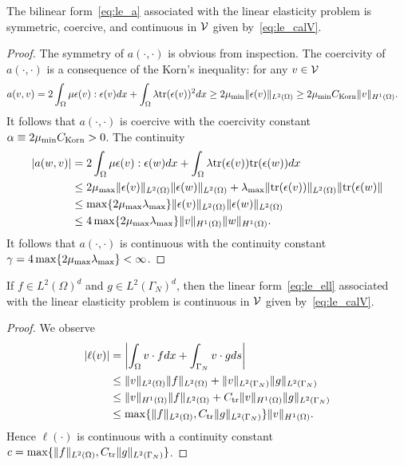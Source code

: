 \begin{proposition}
  The bilinear form~\eqref{eq:le_a} associated with the linear elasticity problem is symmetric, coercive, and continuous in $\mathcal{V}$ given by~\eqref{eq:le_calV}.
  \begin{proof}
    The symmetry of $a(\cdot,\cdot)$ is obvious from inspection. The coercivity of $a(\cdot,\cdot)$ is a consequence of the Korn's inequality: for any $v \in \mathcal{V}$
    \begin{align*}
      a(v,v)
      &= 2 \int_{\Omega} \mu \epsilon(v) : \epsilon(v) dx
      + \int_\Omega  \lambda \text{tr}(\epsilon(v))^2 dx
      \geq 2 \mu_{\rm min} \| \epsilon(v) \|_{L^2(\Omega)}
      \geq 2 \mu_{\rm min} C_{\rm Korn} \| v \|_{H^1(\Omega)}.
    \end{align*}
    It follows that $a(\cdot,\cdot)$ is coercive with the coercivity constant $\alpha \equiv 2 \mu_{\rm min} C_{\rm Korn} > 0$. The continuity
    \begin{align*}
      |a(w,v)|
      &= 2 \int_{\Omega} \mu \epsilon(v) : \epsilon(w) dx
      + \int_\Omega  \lambda \text{tr}(\epsilon(v))\text{tr}(\epsilon(w)) dx
      \\
      &\leq 2 \mu_{\rm max} \| \epsilon(v) \|_{L^2(\Omega)} \| \epsilon(w) \|_{L^2(\Omega)}
      + \lambda_{\rm max} \| \text{tr}(\epsilon(v)) \|_{L^2(\Omega)} \| \text{tr}(\epsilon(w) \|
      \\
      &\leq \max \{ 2\mu_{\rm max} \lambda_{\rm max} \} \| \epsilon(v) \|_{L^2(\Omega)} \| \epsilon(w) \|_{L^2(\Omega)}
      \\
      &\leq 4 \max \{ 2\mu_{\rm max} \lambda_{\rm max} \} \| v \|_{H^1(\Omega)} \| w \|_{H^1(\Omega)}.
    \end{align*}
    It follows that $a(\cdot,\cdot)$ is continuous with the continuity constant $\gamma = 4 \max \{ 2\mu_{\rm max} \lambda_{\rm max} \} < \infty$.
  \end{proof}
\end{proposition}
\begin{proposition}
  If $f \in L^2(\Omega)^d$ and $g \in L^2(\Gamma_N)^d$, then the linear form~\eqref{eq:le_ell} associated with the linear elasticity problem is continuous in $\mathcal{V}$ given by~\eqref{eq:le_calV}.
  \begin{proof}
    We observe
    \begin{align*}
    | \ell(v) | &= \left| \int_{\Omega} v \cdot f dx + \int_{\Gamma_N} v \cdot g ds \right|\\
    &\leq \| v \|_{L^2(\Omega)} \| f \|_{L^2(\Omega)} + \| v \|_{L^2(\Gamma_N)} \| g \|_{L^2(\Gamma_N)}\\
    &\leq \| v \|_{H^1(\Omega)} \| f \|_{L^2(\Omega)} + C_{\rm tr} \| v \|_{H^1(\Omega)} \| g \|_{L^2(\Gamma_N)}\\
    &\leq \max\{ \| f \|_{L^2(\Omega)}, C_{\rm tr} \| g \|_{L^2(\Gamma_N)} \} \| v \|_{H^1(\Omega)}.
    \end{align*}
    Hence $\ell(\cdot)$ is continuous with a continuity constant $c = \max\{ \| f \|_{L^2(\Omega)}, C_{\rm tr} \| g \|_{L^2(\Gamma_N)} \}$.
  \end{proof}
\end{proposition}

